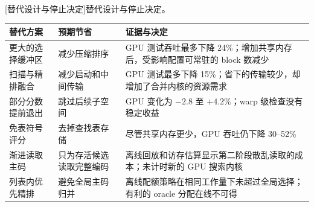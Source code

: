 \par\medskip\noindent\begin{minipage}{\linewidth}
\centering\captionsetup{hypcap=false}
[替代设计与停止决定]{替代设计与停止决定。}
\label{tab:8-stopped}
\footnotesize\setlength{\tabcolsep}{4pt}
\begin{tabularx}{\linewidth}{@{}>{\raggedright\arraybackslash}p{.24\linewidth}>{\raggedright\arraybackslash}p{.24\linewidth}X@{}}
\toprule
替代方案 & 预期节省 & 证据与决定 \\
\midrule
更大的选择缓冲区 & 减少压缩排序 & GPU 测试吞吐最多下降 24\%；增加共享内存后，受影响配置可常驻的 block 数减少 \\
扫描与精排融合 & 减少启动和中间传输 & GPU 测试最多下降 15\%；省下的传输较少，却增加了合并内核的资源需求 \\
部分分数提前退出 & 跳过后续子空间 & GPU 变化为 $-2.8$ 至 $+4.2\%$；warp 级检查没有稳定收益 \\
免表符号评分 & 去掉查找表存储 & 尽管共享内存更少，GPU 吞吐仍下降 30--52\% \\
渐进读取主码 & 只为存活候选读取完整编码 & 离线回放和访存估算显示第二阶段散乱读取的成本；未计时新的 GPU 搜索内核 \\
列表内优先精排 & 避免全局主码归并 & 离线配额策略在相同工作量下未超过全局选择；有利的 oracle 分配在线不可得 \\
\bottomrule
\end{tabularx}
\end{minipage}\par\medskip
